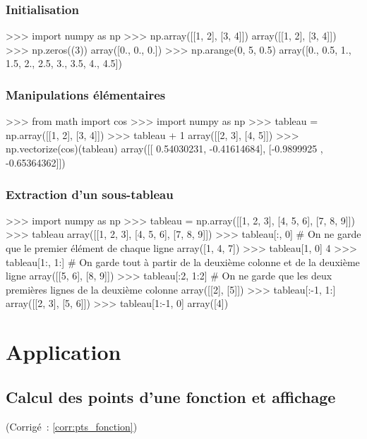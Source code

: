 		\subsubsection{Initialisation}
		
		\begin{pythoncode}
			>>> import numpy as np
			>>> np.array([[1, 2], [3, 4]])
			array([[1, 2],
			       [3, 4]])
			>>> np.zeros((3))
			array([0., 0., 0.])
			>>> np.arange(0, 5, 0.5)
			array([0., 0.5, 1., 1.5, 2., 2.5, 3., 3.5, 4., 4.5])
		\end{pythoncode}
		
		\subsubsection{Manipulations élémentaires}
		
		\begin{pythoncode}
			>>> from math import cos
			>>> import numpy as np
			>>> tableau = np.array([[1, 2], [3, 4]])
			>>> tableau + 1
			array([[2, 3],
			       [4, 5]])
			>>> np.vectorize(cos)(tableau)
			array([[ 0.54030231, -0.41614684],
			       [-0.9899925 , -0.65364362]])
		\end{pythoncode}
		
		\subsubsection{Extraction d'un sous-tableau}
		
		\begin{pythoncode}
			>>> import numpy as np
			>>> tableau = np.array([[1, 2, 3], [4, 5, 6], [7, 8, 9]])
			>>> tableau
			array([[1, 2, 3],
			       [4, 5, 6],
			       [7, 8, 9]])
			>>> tableau[:, 0] # On ne garde que le premier élément de chaque ligne
			array([1, 4, 7])
			>>> tableau[1, 0]
			4
			>>> tableau[1:, 1:] # On garde tout à partir de la deuxième colonne et de la deuxième ligne
			array([[5, 6],
			       [8, 9]])
			>>> tableau[:2, 1:2] # On ne garde que les deux premières lignes de la deuxième colonne
			array([[2],
			       [5]])
			>>> tableau[:-1, 1:]
			array([[2, 3],
			       [5, 6]])
			>>> tableau[1:-1, 0]
			array([4])
		\end{pythoncode}
		
\section{Application}
	
	\subsection{Calcul des points d'une fonction et affichage} \label{appl:pts_fonction} (Corrigé~: \ref{corr:pts_fonction})
		
